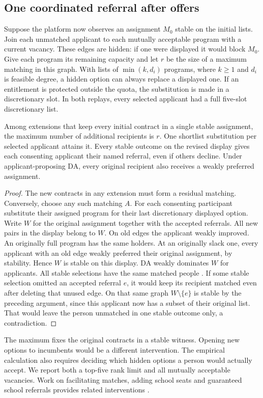 \subsection{One coordinated referral after offers}\label{sec:two-referral}

Suppose the platform now observes an assignment $M_0$ stable on the initial lists. Join each unmatched applicant to each mutually acceptable program with a current vacancy. These edges are hidden: if one were displayed it would block $M_0$. Give each program its remaining capacity and let $r$ be the size of a maximum matching in this graph. With lists of $\min(k,d_i)$ programs, where $k\ge1$ and $d_i$ is feasible degree, a hidden option can always replace a displayed one. If an entitlement is protected outside the quota, the substitution is made in a discretionary slot. In both replays, every selected applicant had a full five-slot discretionary list.

\begin{theorem}\label{thm:two-referral}
Among extensions that keep every initial contract in a single stable assignment, the maximum number of additional recipients is $r$. One shortlist substitution per selected applicant attains it. Every stable outcome on the revised display gives each consenting applicant their named referral, even if others decline. Under applicant-proposing DA, every original recipient also receives a weakly preferred assignment.
\end{theorem}
\begin{proof}
The new contracts in any extension must form a residual matching. Conversely, choose any such matching $A$. For each consenting participant substitute their assigned program for their last discretionary displayed option. Write $W$ for the original assignment together with the accepted referrals. All new pairs in the display belong to $W$. On old edges the applicant weakly improved. An originally full program has the same holders. At an originally slack one, every applicant with an old edge weakly preferred their original assignment, by stability. Hence $W$ is stable on this display. DA weakly dominates $W$ for applicants. All stable selections have the same matched people \citep{roth1986}. If some stable selection omitted an accepted referral $e$, it would keep its recipient matched even after deleting that unused edge. On that same graph $W\setminus\{e\}$ is stable by the preceding argument, since this applicant now has a subset of their original list. That would leave the person unmatched in one stable outcome only, a contradiction.
\end{proof}
The maximum fixes the original contracts in a stable witness. Opening new options to incumbents would be a different intervention. The empirical calculation also requires deciding which hidden options a person would actually accept. We report both a top-five rank limit and all mutually acceptable vacancies. Work on facilitating matches, adding school seats and guaranteed school referrals provides related interventions \citep{facilitate,tworound,lepesure}.

